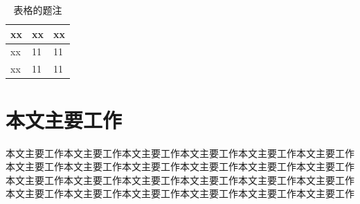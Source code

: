 \begin{table}[h!]
	\centering
	\caption{表格的题注}
	\label{tab:table_eg_1}
	\begin{tabular}{l|ll}
		\hline
		xx & xx & xx \\ \hline
		xx & 11 & 11 \\
		xx & 11 & 11 \\ \hline
	\end{tabular}
\end{table}

\section{本文主要工作}
本文主要工作本文主要工作本文主要工作本文主要工作本文主要工作本文主要工作本文主要工作本文主要工作本文主要工作本文主要工作本文主要工作本文主要工作本文主要工作本文主要工作本文主要工作本文主要工作本文主要工作本文主要工作本文主要工作本文主要工作本文主要工作本文主要工作本文主要工作本文主要工作

